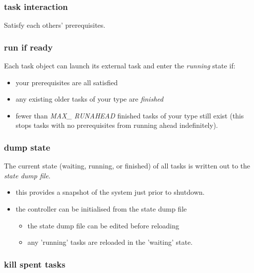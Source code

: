 \documentclass[11pt,a4paper]{report}
\begin{document}
\subsubsection{task interaction} 

Satisfy each others' prerequisites. 

\subsubsection{run if ready} 

Each task object can launch its external task and enter the
    {\em running} state if:
        \begin{itemize}
        \item your prerequisites are all satisfied
        \item any existing older tasks of your type are {\em finished} 
        \item fewer than {\em MAX\_ RUNAHEAD} finished tasks of your
        type still exist (this stops tasks with no prerequisites from
        running ahead indefinitely).
        \end{itemize}

\subsubsection{dump state} 

The current state (waiting, running, or
    finished) of all tasks is written out to the {\em state dump file}.
        \begin{itemize}
        \item this provides a snapshot of the system just prior to shutdown.

        \item the controller can be initialised from the state dump file
            \begin{itemize}
            \item the state dump file can be edited before reloading

            \item any 'running' tasks are reloaded in the 'waiting' state.
            \end{itemize}
        \end{itemize}

\subsubsection{kill spent tasks} 
\end{document}

